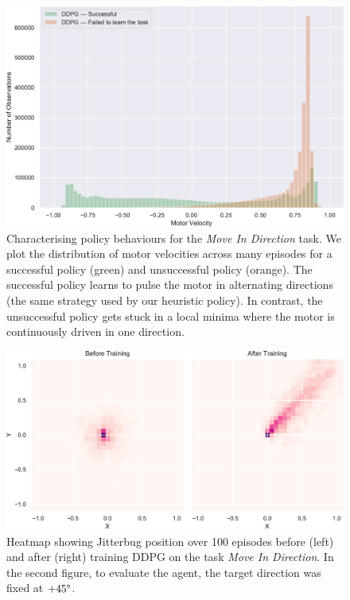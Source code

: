\documentclass[letterpaper, 10 pt, conference]{ieeeconf}
\begin{document}
\begin{figure}[ht]
    \centering
    \includegraphics[width=\linewidth]{fig-motor-hist}
    \caption{
        Characterising policy behaviours for the \emph{Move In Direction} task.
        We plot the distribution of motor velocities across many episodes for a successful policy (green) and unsuccessful policy (orange).
        The successful policy learns to pulse the motor in alternating directions (the same strategy used by our heuristic policy).
        In contrast, the unsuccessful policy gets stuck in a local minima where the motor is continuously driven in one direction.
    }
    \label{fig:motor-hist}
\end{figure}

\begin{figure}[ht]
    \centering
    \includegraphics[width=\linewidth]{fig-heatmap}
    \caption{
        Heatmap showing Jitterbug position over 100 episodes before (left) and after (right) training DDPG on the task \emph{Move In Direction}.
        In the second figure, to evaluate the agent, the target direction was fixed at $+45\degree$.
    }
\label{fig:heatmap}
\end{figure}
\end{document}
